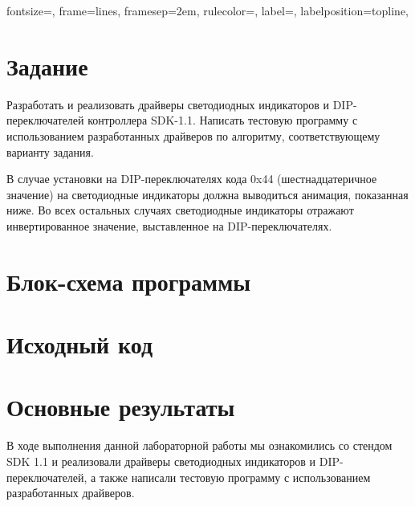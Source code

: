 
\isonefalse
\isnametrue
\def \labnum {1}
\def \labsubj {Информационно-управляющие системы}
\def \labauthor {Айтуганов Д. А. \\ Чебыкин И. Б.}
\def \labgroup {P3401}
\def \labinsp {Пинкевич В. Ю.}
\def \labname {Вариант 4}

\usepackage{graphicx,tabularx}

\usepackage{caption}
\usepackage{verbatim}
\usepackage[dvipsnames]{xcolor}

\usepackage{fancyvrb}

 {
 fontsize=\scriptsize,
 frame=lines,  %
 framesep=2em, %
 rulecolor=\color{Gray},
 label=,
 labelposition=topline,
}

\captionsetup{labelsep=period}
\pagestyle{fancy}


\section{Задание}
Разработать и реализовать драйверы светодиодных индикаторов и DIP-переключателей
контроллера SDK-1.1. Написать тестовую программу с использованием разработанных
драйверов по алгоритму, соответствующему варианту задания.

В случае установки на DIP-переключателях кода 0x44 (шестнадцатеричное значение) на
светодиодные индикаторы должна выводиться анимация, показанная ниже. Во всех
остальных случаях светодиодные индикаторы отражают инвертированное значение,
выставленное на DIP-переключателях.

\section{Блок-схема программы}

\newpage

\section{Исходный код}
\section{Основные результаты}
В ходе выполнения данной лабораторной работы мы ознакомились со стендом SDK 1.1
и реализовали драйверы светодиодных индикаторов и DIP-переключателей, а также
написали тестовую программу с использованием разработанных драйверов.


